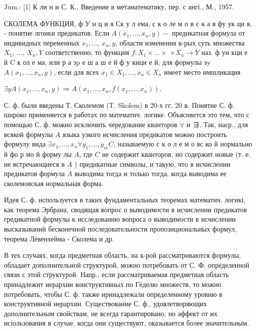 \documentclass[10pt]{article}
\begin{document}
Jum.: [1] К ли н и С. К., Введение в метаматематику, пер. с ангі., М., 1957.



СКОЛЕМА ФУНКЦИЯ, ф У н ц и я Ск у л ема, с к о ле м о в с к а я фу ук ци я, - понятие лгоики предикатов. Если $A\left(x_{1}, \ldots, x_{n}, y\right)-$ предикатная формула от индивидных переменных $x_{1}, \ldots$, $x_{n}, y$, области изменения к-рых суть множества $X_{1}$, ..., $X_{n}, Y$ соответственно, то функция $f: X_{1} \times \ldots \times$ $\times X_{n} \rightarrow Y$ наз. ф ун кци е й $\mathrm{C}$ к ол е ма, или р а з$\mathrm{p}$ е ш а ш е й ф у кици е й, для формулы эy $A\left(x_{1}, \ldots, x_{n}, y\right)$, если для всех $x_{1} \in X_{1}, \ldots, x_{n} \in X_{n}$ имеет место имшликация



$\exists y A\left(x_{1}, \ldots, x_{n}, y\right) \Rightarrow A\left(x_{1}, \ldots, x_{n}, f\left(x_{1}, \ldots, x_{n}\right)\right)$.



С. ф. были введены Т. Сколемом (T. Skolem) в 20-х гг. 20 в. Понятие С. ф. широко применяется в работах по математич. логике. Объясняется это тем, что с помощью С. ф. можно исключить чередование кванторов $\forall$ и $ヨ$. Так, наєр., для всякой формулы $A$ языка узкого исчисления предикатов можно построить формулу вида $\exists x_{1}, \ldots, x_{n} \forall y_{1}, \ldots, y_{m} C$, называемую с к о л е м о вс ко й нормально й фо р мо й форму лы $A$, где $C$ не содержит кванторов, но содержит новые (т. е. не встречающиеся в $A$ ) предикатные символы, и такую, что в исчислении предикатов формула $A$ выводима тогда и только тогда, когда выводима ее сколемовская нормальная форма.



Идея С. ф. используется в таких фундаментальных теоремах математич. логикі, как теорема Эрбрана, сводящая вопрос о выводимости в исчислении предикатов гредикатной формулы к исследованию вопроса о выводимости в исчислении высказываний бесконечной последовательности пропозициональных формул, теорема Лёвенхейма - Сколема и др.



В тех случаях, когда предметная область, на к-рой рассматриваются формулы, обладает дополнительной структурой, можно потребовать от С. Ф. определенной связи с этой структурой. Напр., если рассматриваемая предметная область принадлежит иерархии конструктивных по Гёделю множеств, то можно потребовать, чтобы С. ф. также иринадлежали определенному уровню в конструктивной иерархии. Существование С. ф., удовлетворяющих дополнительным свойствам, не всегда гарантировано, но әффект от их исіользования в случае, когда они существуют, оказывается более значительным.
\end{document}
